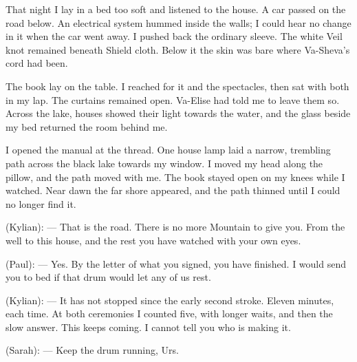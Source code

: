 \ornament

That night I lay in a bed too soft and listened to the house. A car passed on the road below. An electrical system hummed inside the walls; I could hear no change in it when the car went away. I pushed back the ordinary sleeve. The white Veil knot remained beneath Shield cloth. Below it the skin was bare where Va-Sheva's cord had been.\par

The book lay on the table. I reached for it and the spectacles, then sat with both in my lap. The curtains remained open. Va-Elise had told me to leave them so. Across the lake, houses showed their light towards the water, and the glass beside my bed returned the room behind me.\par

I opened the manual at the thread. One house lamp laid a narrow, trembling path across the black lake towards my window. I moved my head along the pillow, and the path moved with me. The book stayed open on my knees while I watched. Near dawn the far shore appeared, and the path thinned until I could no longer find it.\par

\ornament

\begin{room}

(Kylian): --- That is the road. There is no more Mountain to give you. From the well to this house, and the rest you have watched with your own eyes.

(Paul): --- Yes. By the letter of what you signed, you have finished. I would send you to bed if that drum would let any of us rest.

(Kylian): --- It has not stopped since the early second stroke. Eleven minutes, each time. At both ceremonies I counted five, with longer waits, and then the slow answer. This keeps coming. I cannot tell you who is making it.

(Sarah): --- Keep the drum running, Urs.

\end{room}

\ornament

